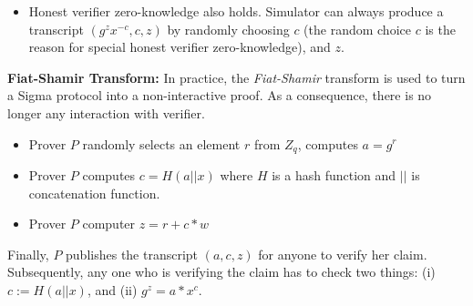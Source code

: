 {\begin{itemize}
     \item Honest verifier zero-knowledge also holds. Simulator can always produce a transcript $(g^{z} x^{-c}, c, z)$ by randomly 
     choosing $c$ (the random choice $c$ is the reason for special honest verifier zero-knowledge), and $z$. 
     \end{itemize}
     
     \textbf{Fiat-Shamir Transform:}
      In practice, the \textit{Fiat-Shamir} \citep{10.5555/36664.36676} transform is used to turn a Sigma protocol into a non-interactive proof. 
      As a consequence, there is no longer any interaction with verifier.  
      
      \begin{itemize}
     \item Prover $P$ randomly selects an element $r$ from $Z_{q}$, computes $a = g^r$
     \item Prover $P$ computes $c =  H(a || x)$ where $H$ is a hash function and $||$ is concatenation function. 
     \item Prover $P$ computer $z = r + c  * w $
     \end{itemize}
      Finally, $P$ publishes the transcript $(a, c, z)$ for anyone to verify her claim. Subsequently, 
      any one who is verifying the claim has to check two things: (i) $c := H (a || x)$, and (ii) 
      $g^{z} = a * x^{c}$. 
      
   
}
